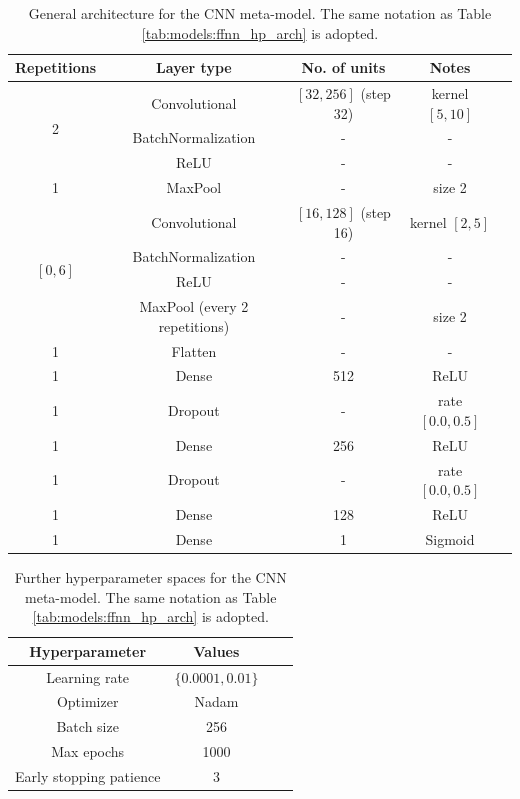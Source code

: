 \documentclass{article}
\begin{document}
\begin{table}
    \centering
    \begin{tabular}{ccccc}
        \toprule
        Repetitions & Layer type & No. of units & Notes \\
        \midrule
        \multirow{3}{*}{2} & Convolutional & $[32, 256]$ (step 32) & kernel $[5, 10]$ \\
        & BatchNormalization & - & - \\
        & ReLU & - & - \\\hline
        1 & MaxPool & - & size 2 \\\hline
        \multirow{4}{*}{$[0, 6]$} & Convolutional & $[16, 128]$ (step 16) & kernel $[2, 5]$ \\
        & BatchNormalization & - & - \\
        & ReLU & - & - \\
        & MaxPool (every 2 repetitions) & - & size 2 \\\hline
        1 & Flatten & - & - \\\hline
        1 & Dense & 512 & ReLU \\\hline
        1 & Dropout & - & rate $[0.0, 0.5]$ \\\hline
        1 & Dense & 256 & ReLU \\\hline
        1 & Dropout & - & rate $[0.0, 0.5]$ \\\hline
        1 & Dense & 128 & ReLU \\\hline
        1 & Dense & 1 & Sigmoid \\
        \bottomrule
    \end{tabular}
    \caption{General architecture for the CNN meta-model. The same notation as Table \ref{tab:models:ffnn_hp_arch} is adopted.}
    \label{tab:models:cnn_hp_arch}
\end{table}

\begin{table}
    \centering
    \begin{tabular}{cccc}
        \toprule
        Hyperparameter & Values \\
        \midrule
        Learning rate & $\{0.0001, 0.01\}$ \\
        Optimizer & Nadam \\
        Batch size & 256 \\
        Max epochs & 1000 \\
        Early stopping patience & 3 \\
        \bottomrule
    \end{tabular}
    \caption{Further hyperparameter spaces for the CNN meta-model. The same notation as Table \ref{tab:models:ffnn_hp_arch} is adopted.}
    \label{tab:models:cnn_hp_hps}
\end{table}
\end{document}
